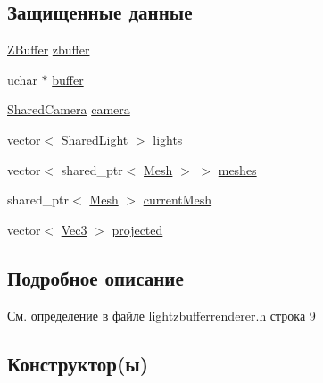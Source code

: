 \subsection*{Защищенные данные}
\begin{DoxyCompactItemize}
\item 
\hyperlink{class_z_buffer}{Z\+Buffer} \hyperlink{class_light_z_buffer_renderer_ad2acd2dd6506b9847a5ab10405b3a856}{zbuffer}
\item 
uchar $\ast$ \hyperlink{class_light_z_buffer_renderer_adb59e3ede69cc0d7ebf1c203bd01a8fd}{buffer}
\item 
\hyperlink{camera_8h_a01f929aec8e912be07dca2c1f8d00f67}{Shared\+Camera} \hyperlink{class_light_z_buffer_renderer_a0484f1880ff31e965399a77b8795903f}{camera}
\item 
vector$<$ \hyperlink{light_8h_ae1ec32369be93ce20c1e9047a8d388c0}{Shared\+Light} $>$ \hyperlink{class_light_z_buffer_renderer_aa656a2afff0d9f793c6f93000fdc6f88}{lights}
\item 
vector$<$ shared\+\_\+ptr$<$ \hyperlink{class_mesh}{Mesh} $>$ $>$ \hyperlink{class_light_z_buffer_renderer_ab019713ebac78d9b63039a06900f1c76}{meshes}
\item 
shared\+\_\+ptr$<$ \hyperlink{class_mesh}{Mesh} $>$ \hyperlink{class_light_z_buffer_renderer_a7971a31fc4b6ce58e115fa0a3580f46c}{current\+Mesh}
\item 
vector$<$ \hyperlink{vec3_8h_a221ad8ea4d9be4111628ee1ca22ee3ba}{Vec3} $>$ \hyperlink{class_light_z_buffer_renderer_a809ed37dacd61c93f142be3ed674bc6f}{projected}
\end{DoxyCompactItemize}


\subsection{Подробное описание}


См. определение в файле lightzbufferrenderer.\+h строка 9



\subsection{Конструктор(ы)}
